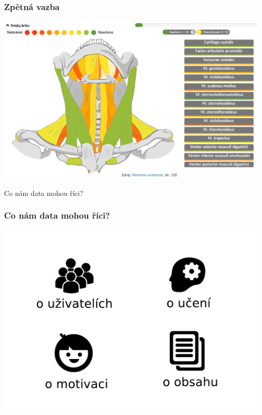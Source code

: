 \documentclass[xcolor=svgnames]{beamer}
\begin{document}
\begin{frame}
	\frametitle{Zpětná vazba}
	\begin{center}
		\includegraphics[width=\textwidth]{img/knowledge_feedback_detail}
	\end{center}
\end{frame}
\begin{frame}
	\begin{center}
		\Huge{Co nám data mohou říci?}
	\end{center}
\end{frame}
\begin{frame}
	\frametitle{Co nám data mohou říci?}
	\includegraphics[width=\textwidth]{img/experiments_intro}
\end{frame}
\end{document}
